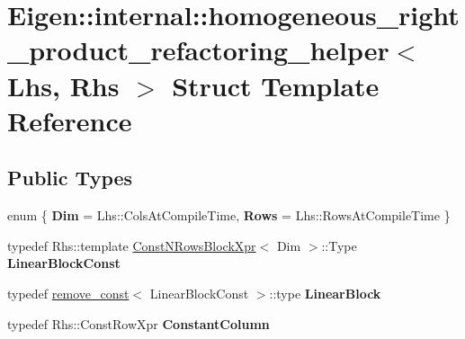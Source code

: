 \hypertarget{struct_eigen_1_1internal_1_1homogeneous__right__product__refactoring__helper}{}\section{Eigen\+::internal\+::homogeneous\+\_\+right\+\_\+product\+\_\+refactoring\+\_\+helper$<$ Lhs, Rhs $>$ Struct Template Reference}
\label{struct_eigen_1_1internal_1_1homogeneous__right__product__refactoring__helper}
\subsection*{Public Types}
\begin{DoxyCompactItemize}
\item 
\mbox{\label{struct_eigen_1_1internal_1_1homogeneous__right__product__refactoring__helper_a255eee8ccd9d700ab1f4e6872912f129}} 
enum \{ {\bfseries Dim} = Lhs\+::Cols\+At\+Compile\+Time, 
{\bfseries Rows} = Lhs\+::Rows\+At\+Compile\+Time
 \}
\item 
\mbox{\label{struct_eigen_1_1internal_1_1homogeneous__right__product__refactoring__helper_abc0a2782658c1b25b54edf8ca9c982fc}} 
typedef Rhs\+::template \mbox{\hyperlink{struct_const_n_rows_block_xpr}{Const\+N\+Rows\+Block\+Xpr}}$<$ Dim $>$\+::Type {\bfseries Linear\+Block\+Const}
\item 
\mbox{\label{struct_eigen_1_1internal_1_1homogeneous__right__product__refactoring__helper_a4ddc4b0c9f5b54828d26107b086149a0}} 
typedef \mbox{\hyperlink{struct_eigen_1_1internal_1_1remove__const}{remove\+\_\+const}}$<$ Linear\+Block\+Const $>$\+::type {\bfseries Linear\+Block}
\item 
\mbox{\label{struct_eigen_1_1internal_1_1homogeneous__right__product__refactoring__helper_a99306f0a1043e4730d6b5ba9a04e5757}} 
typedef Rhs\+::\+Const\+Row\+Xpr {\bfseries Constant\+Column}
\item 

\end{DoxyCompactItemize}
